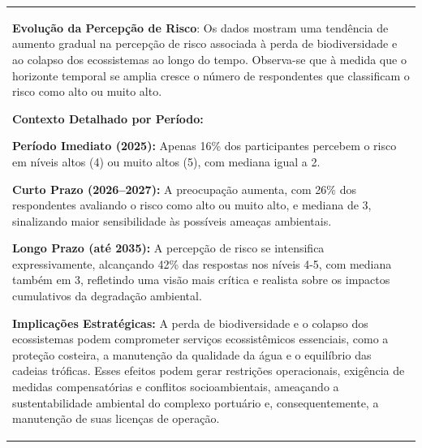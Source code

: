 \documentclass[
  portuguese,
  letterpaper,
  DIV=11,
  numbers=noendperiod]{scrreprt}
\begin{document}
\begin{tcolorbox}[enhanced jigsaw, breakable, leftrule=.75mm, opacitybacktitle=0.6, coltitle=black, rightrule=.15mm, colbacktitle=quarto-callout-tip-color!10!white, colframe=quarto-callout-tip-color-frame, titlerule=0mm, bottomtitle=1mm, colback=white, toprule=.15mm, toptitle=1mm, left=2mm, title=\textcolor{quarto-callout-tip-color}{\faLightbulb}\hspace{0.5em}{Destaques}, opacityback=0, bottomrule=.15mm, arc=.35mm]

\begin{longtable}[]{@{}
  >{\raggedright\arraybackslash}p{}@{}}
\toprule\noalign{}
\endhead
\bottomrule\noalign{}
\endlastfoot
\textbf{Evolução da Percepção de Risco}: Os dados mostram uma tendência
de aumento gradual na percepção de risco associada à perda de
biodiversidade e ao colapso dos ecossistemas ao longo do tempo.
Observa-se que à medida que o horizonte temporal se amplia cresce o
número de respondentes que classificam o risco como alto ou muito alto.

\textbf{Contexto Detalhado por Período:}

\textbf{Período Imediato (2025):} Apenas 16\% dos participantes percebem
o risco em níveis altos (4) ou muito altos (5), com mediana igual a 2.

\textbf{Curto Prazo (2026--2027):} A preocupação aumenta, com 26\% dos
respondentes avaliando o risco como alto ou muito alto, e mediana de 3,
sinalizando maior sensibilidade às possíveis ameaças ambientais.
\textbar{}

\textbf{Longo Prazo (até 2035):} A percepção de risco se intensifica
expressivamente, alcançando 42\% das respostas nos níveis 4-5, com
mediana também em 3, refletindo uma visão mais crítica e realista sobre
os impactos cumulativos da degradação ambiental. \textbar{}

\textbf{Implicações Estratégicas:} A perda de biodiversidade e o colapso
dos ecossistemas podem comprometer serviços ecossistêmicos essenciais,
como a proteção costeira, a manutenção da qualidade da água e o
equilíbrio das cadeias tróficas. Esses efeitos podem gerar restrições
operacionais, exigência de medidas compensatórias e conflitos
socioambientais, ameaçando a sustentabilidade ambiental do complexo
portuário e, consequentemente, a manutenção de suas licenças de
operação. \\
\end{longtable}

\end{tcolorbox}
\end{document}
